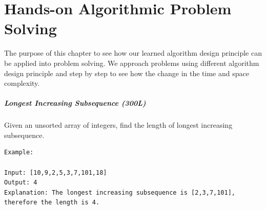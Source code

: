 \documentclass[../main.tex]{subfiles}
\begin{document}
\chapter{Hands-on Algorithmic Problem Solving}
The purpose of this chapter to see how our learned algorithm design principle can be applied into problem solving. We approach problems  using different algorithm design principle and step by step to see how the change in the time and space complexity. 

\paragraph{Longest Increasing Subsequence (300L)} Given an unsorted array of integers, find the length of longest increasing subsequence.
\begin{lstlisting}[numbers=none]
Example:

Input: [10,9,2,5,3,7,101,18]
Output: 4 
Explanation: The longest increasing subsequence is [2,3,7,101], therefore the length is 4. 
\end{lstlisting}


\end{document}
